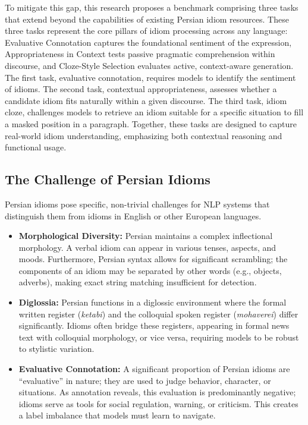 \documentclass[11pt,a4paper]{article}
\begin{document}
To mitigate this gap, this research proposes a benchmark comprising three tasks that extend beyond the capabilities of existing Persian idiom resources. These three tasks represent the core pillars of idiom processing across any language: Evaluative Connotation captures the foundational sentiment of the expression, Appropriateness in Context tests passive pragmatic comprehension within discourse, and Cloze-Style Selection evaluates active, context-aware generation. The first task, evaluative connotation, requires models to identify the sentiment of idioms. The second task, contextual appropriateness, assesses whether a candidate idiom fits naturally within a given discourse. The third task, idiom cloze, challenges models to retrieve an idiom suitable for a specific situation to fill a masked position in a paragraph. Together, these tasks are designed to capture real-world idiom understanding, emphasizing both contextual reasoning and functional usage.

\subsection{The Challenge of Persian Idioms}
Persian idioms pose specific, non-trivial challenges for NLP systems that distinguish them from idioms in English or other European languages.
\begin{itemize}
    \item \textbf{Morphological Diversity:} Persian maintains a complex inflectional morphology. A verbal idiom can appear in various tenses, aspects, and moods. Furthermore, Persian syntax allows for significant scrambling; the components of an idiom may be separated by other words (e.g., objects, adverbs), making exact string matching insufficient for detection.
    \item \textbf{Diglossia:} Persian functions in a diglossic environment where the formal written register (\textit{ketabi}) and the colloquial spoken register (\textit{mohaverei}) differ significantly. Idioms often bridge these registers, appearing in formal news text with colloquial morphology, or vice versa, requiring models to be robust to stylistic variation.
    \item \textbf{Evaluative Connotation:} A significant proportion of Persian idioms are ``evaluative'' in nature; they are used to judge behavior, character, or situations. As annotation reveals, this evaluation is predominantly negative; idioms serve as tools for social regulation, warning, or criticism. This creates a label imbalance that models must learn to navigate.
\end{itemize}
\end{document}
